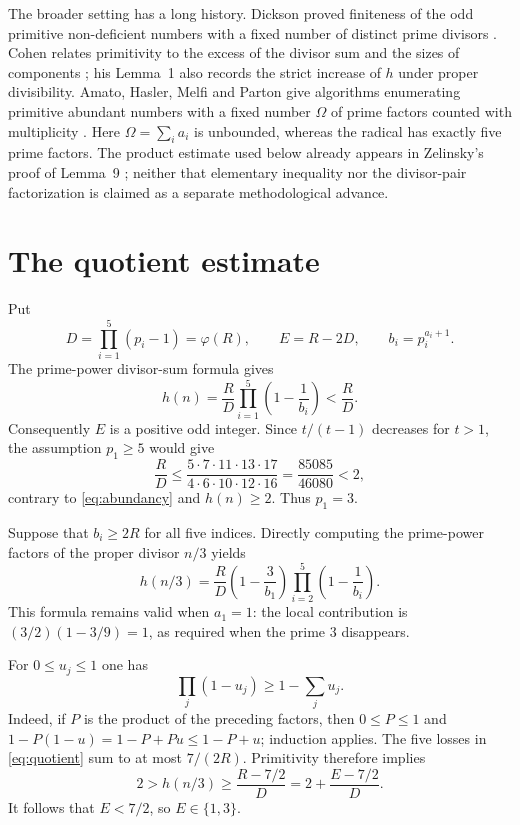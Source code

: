 \documentclass[11pt]{article}
\newcommand{\ph}{\varphi}
\begin{document}
The broader setting has a long history. Dickson proved finiteness of
the odd primitive non-deficient numbers with a fixed number of distinct
prime divisors \cite{Dickson1913}. Cohen relates primitivity to the
excess of the divisor sum and the sizes of components
\cite[Theorem~1 and Remark~1]{Cohen1983}; his Lemma~1 also records
the strict increase of $h$ under proper divisibility.
Amato, Hasler, Melfi and Parton give algorithms enumerating primitive
abundant numbers with a fixed number $\Omega$ of prime factors counted
with multiplicity \cite{AmatoEtAl2019}.
Here $\Omega=\sum_i a_i$ is unbounded, whereas the radical has exactly
five prime factors. The product estimate used below already appears in
Zelinsky's proof of Lemma~9 \cite{Zelinsky2026}; neither that elementary
inequality nor the divisor-pair factorization is claimed as a separate
methodological advance.

\section{The quotient estimate}

Put
\[
 D=\prod_{i=1}^{5}(p_i-1)=\ph(R),\qquad
 E=R-2D,\qquad b_i=p_i^{a_i+1}.
\]
The prime-power divisor-sum formula gives
\begin{equation}\label{eq:abundancy}
 h(n)=\frac{R}{D}\prod_{i=1}^{5}\left(1-\frac1{b_i}\right)
 <\frac{R}{D}.
\end{equation}
Consequently $E$ is a positive odd integer. Since $t/(t-1)$ decreases
for $t>1$, the assumption $p_1\ge5$ would give
\[
 \frac{R}{D}\le
 \frac{5\cdot7\cdot11\cdot13\cdot17}{4\cdot6\cdot10\cdot12\cdot16}
 =\frac{85085}{46080}<2,
\]
contrary to \eqref{eq:abundancy} and $h(n)\ge2$. Thus $p_1=3$.

Suppose that $b_i\ge2R$ for all five indices. Directly computing the
prime-power factors of the proper divisor $n/3$ yields
\begin{equation}\label{eq:quotient}
 h(n/3)=\frac{R}{D}\left(1-\frac3{b_1}\right)
                   \prod_{i=2}^{5}\left(1-\frac1{b_i}\right).
\end{equation}
This formula remains valid when $a_1=1$: the local contribution is
$(3/2)(1-3/9)=1$, as required when the prime $3$ disappears.

For $0\le u_j\le1$ one has
\begin{equation}\label{eq:loss}
 \prod_j(1-u_j)\ge1-\sum_j u_j.
\end{equation}
Indeed, if $P$ is the product of the preceding factors, then
$0\le P\le1$ and $1-P(1-u)=1-P+Pu\le1-P+u$; induction applies.
The five losses in \eqref{eq:quotient} sum to at most $7/(2R)$.
Primitivity therefore implies
\begin{equation}\label{eq:gap}
 2>h(n/3)\ge\frac{R-7/2}{D}
             =2+\frac{E-7/2}{D}.
\end{equation}
It follows that $E<7/2$, so $E\in\{1,3\}$.
\end{document}
